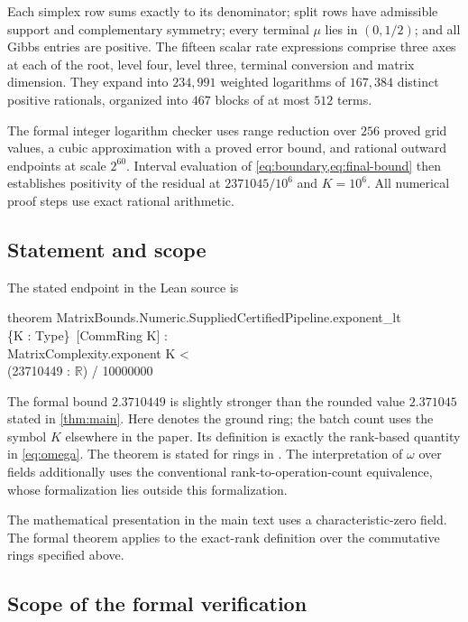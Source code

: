 \documentclass[11pt,a4paper]{article}
\begin{document}
Each simplex row sums exactly to its denominator; split rows have admissible support and complementary symmetry; every terminal $\mu$ lies in $(0,1/2)$; and all Gibbs entries are positive. The fifteen scalar rate expressions comprise three axes at each of the root, level four, level three, terminal conversion and matrix dimension. They expand into $234{,}991$ weighted logarithms of $167{,}384$ distinct positive rationals, organized into $467$ blocks of at most $512$ terms.

The formal integer logarithm checker uses range reduction over $256$ proved grid values, a cubic approximation with a proved error bound, and rational outward endpoints at scale $2^{60}$. Interval evaluation of \cref{eq:boundary,eq:final-bound} then establishes positivity of the residual at $2371045/10^6$ and $K=10^6$. All numerical proof steps use exact rational arithmetic.

\subsection{Statement and scope}

The stated endpoint in the Lean source is
\begin{algorithmnote}
\small\ttfamily
\noindent theorem MatrixBounds.Numeric.SuppliedCertifiedPipeline.exponent\_lt\\
\hspace*{1em}\{K : Type\}\ [CommRing K] :\\
\hspace*{2em}MatrixComplexity.exponent K <\\
\hspace*{3em}(23710449 : $\mathbb R$) / 10000000
\end{algorithmnote}
The formal bound $2.3710449$ is slightly stronger than the rounded value $2.371045$ stated in \cref{thm:main}. Here  denotes the ground ring; the batch count uses the symbol $K$ elsewhere in the paper. Its  definition is exactly the rank-based quantity in \cref{eq:omega}. The theorem is stated for rings in . The interpretation of $\omega$ over fields additionally uses the conventional rank-to-operation-count equivalence, whose formalization lies outside this formalization.

The mathematical presentation in the main text uses a characteristic-zero field. The formal theorem applies to the exact-rank definition over the commutative rings specified above.

\subsection{Scope of the formal verification}
\end{document}
